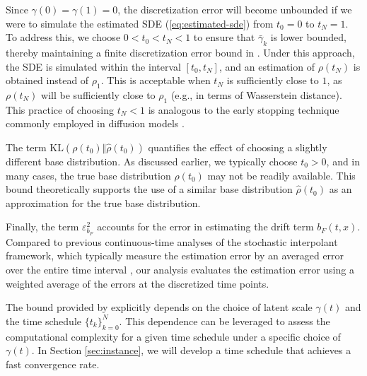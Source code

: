 Since $\gamma(0)=\gamma(1)=0$, the discretization error will become unbounded if we were to simulate the estimated SDE (\ref{eq:estimated-sde}) from $t_0=0$ to $t_N=1$. To address this, we choose $0<t_0<t_N<1$ to ensure that $\bar{\gamma}_k$ is lower bounded, thereby maintaining a finite discretization error bound in . Under this approach, the SDE is simulated within the interval $[t_0,t_N]$, and an estimation of $\rho(t_N)$ is obtained instead of $\rho_1$. This is acceptable when $t_N$ is sufficiently close to $1$, as $\rho(t_N)$ will be sufficiently close to $\rho_1$ (e.g., in terms of Wasserstein distance). This practice of choosing $t_N<1$ is analogous to the early stopping technique commonly employed in diffusion models \cite{song2021scorebased,chen2023improved,dlinear}. %

The term $\text{KL}(\rho(t_0)\Vert\hat{\rho}(t_0))$ quantifies the effect of choosing a slightly different base distribution. As discussed earlier, we typically choose $t_0>0$, and in many cases, the true base distribution $\rho(t_0)$ may not be readily available. This bound theoretically supports the use of a similar base distribution $\hat{\rho}(t_0)$ as an approximation for the true base distribution. 

Finally, the term $\varepsilon_{b_F}^2$ accounts for the error in estimating the drift term $b_F(t,x)$. %
Compared to previous continuous-time analyses of the stochastic interpolant framework, which typically measure the estimation error by an averaged error over the entire time interval \cite{flows, interpolation}, our analysis evaluates the estimation error using a weighted average of the errors at the discretized time points.

The bound provided by  explicitly depends on the choice of latent scale $\gamma(t)$ and the time schedule $\{t_k\}_{k=0}^N$. This dependence can be leveraged to assess the computational complexity for a given time schedule under a specific choice of $\gamma(t)$. In Section \ref{sec:instance}, we will develop a time schedule that achieves a fast convergence rate. %



